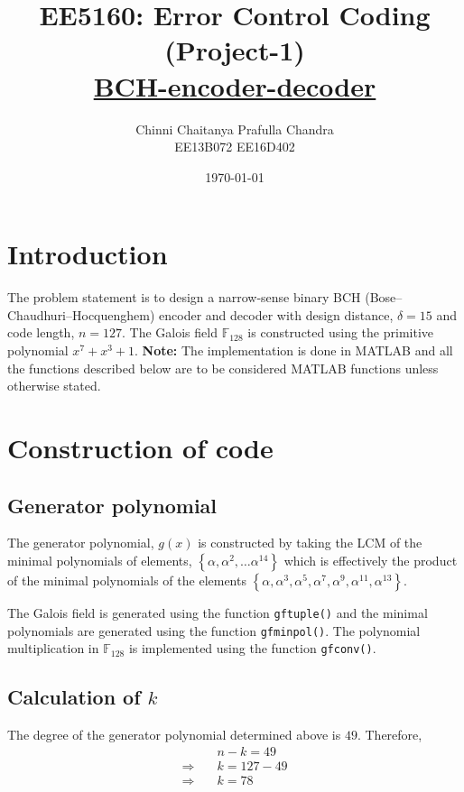 \documentclass[10 pt]{article}
\title{
	EE5160: Error Control Coding \\ 
    (Project-1) \\ 
    \underline{BCH-encoder-decoder}
}
\author{
	Chinni Chaitanya \quad \quad Prafulla Chandra \\
    EE13B072 \quad \quad EE16D402
}
\date{\today}
\begin{document}
\maketitle

\section{Introduction}
\label{sec:introduction}
The problem statement is to design a narrow-sense binary BCH (Bose–Chaudhuri–Hocquenghem) encoder and decoder with design distance, $\delta = 15$ and code length, $n = 127$. The Galois field $\mathbb{F}_{128}$ is constructed using the primitive polynomial $x^{7} + x^{3} + 1$. \newline \newline
\textbf{Note:} The implementation is done in MATLAB and all the functions described below are to be considered MATLAB functions unless otherwise stated.

\section{Construction of code}
\label{sec:construction}
\subsection{Generator polynomial}
The generator polynomial, $g(x)$ is constructed by taking the LCM of the minimal polynomials of elements, $\left\lbrace \alpha, \alpha^{2}, \hdots \alpha^{14} \right\rbrace$ which is effectively the product of the minimal polynomials of the elements $\left\lbrace \alpha, \alpha^{3}, \alpha^{5}, \alpha^{7}, \alpha^{9}, \alpha^{11}, \alpha^{13} \right\rbrace$.

The Galois field is generated using the function \texttt{gftuple()} and the minimal polynomials are generated using the function \texttt{gfminpol()}. The polynomial multiplication in $\mathbb{F}_{128}$ is implemented using the function \texttt{gfconv()}.

\subsection{Calculation of $k$}
The degree of the generator polynomial determined above is $49$. Therefore,
\begin{align*}
	&n-k = 49 \\
	\Longrightarrow \quad &k = 127-49 \\
	\Longrightarrow \quad &k = 78
\end{align*}
\end{document}
